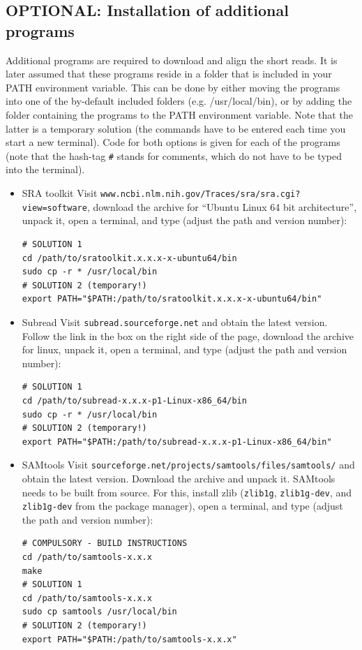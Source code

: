 \documentclass[a4paper,10pt]{article}
\begin{document}
\subsection{OPTIONAL: Installation of additional programs}
Additional programs are required to download and align the short reads. It is later assumed that these programs reside in a folder that is included in your PATH environment variable. This can be done by either moving the programs into one of the by-default included folders (e.g. /usr/local/bin), or by adding the folder containing the programs to the PATH environment variable. Note that the latter is a temporary solution (the commands have to be entered each time you start a new terminal). Code for both options is given for each of the programs (note that the hash-tag \texttt{\#} stands for comments, which do not have to be typed into the terminal).
\begin{itemize}
\item SRA toolkit\newline
Visit \texttt{www.ncbi.nlm.nih.gov/Traces/sra/sra.cgi?view=software}, download the archive for ``Ubuntu Linux 64 bit architecture'', unpack it, open a terminal, and type (adjust the path and version number):
\begin{verbatim}
# SOLUTION 1
cd /path/to/sratoolkit.x.x.x-x-ubuntu64/bin
sudo cp -r * /usr/local/bin
# SOLUTION 2 (temporary!)
export PATH="$PATH:/path/to/sratoolkit.x.x.x-x-ubuntu64/bin"
\end{verbatim}
 \item Subread \cite{2013_Liao} \newline
Visit \texttt{subread.sourceforge.net} and obtain the latest version. Follow the link in the box on the right side of the page, download the archive for linux, unpack it, open a terminal, and type (adjust the path and version number):
\begin{verbatim}
# SOLUTION 1
cd /path/to/subread-x.x.x-p1-Linux-x86_64/bin
sudo cp -r * /usr/local/bin
# SOLUTION 2 (temporary!)
export PATH="$PATH:/path/to/subread-x.x.x-p1-Linux-x86_64/bin"
\end{verbatim}
\item SAMtools \cite{2009_Li} \newline
Visit \texttt{sourceforge.net/projects/samtools/files/samtools/} and obtain the latest version. Download the archive and unpack it. SAMtools needs to be built from source. For this, install zlib (\texttt{zlib1g}, \texttt{zlib1g-dev}, and \texttt{zlib1g-dev} from the package manager), open a terminal, and type (adjust the path and version number):
\begin{verbatim}
# COMPULSORY - BUILD INSTRUCTIONS
cd /path/to/samtools-x.x.x
make
# SOLUTION 1
cd /path/to/samtools-x.x.x
sudo cp samtools /usr/local/bin
# SOLUTION 2 (temporary!)
export PATH="$PATH:/path/to/samtools-x.x.x"
\end{verbatim}
\end{itemize}
\end{document}
